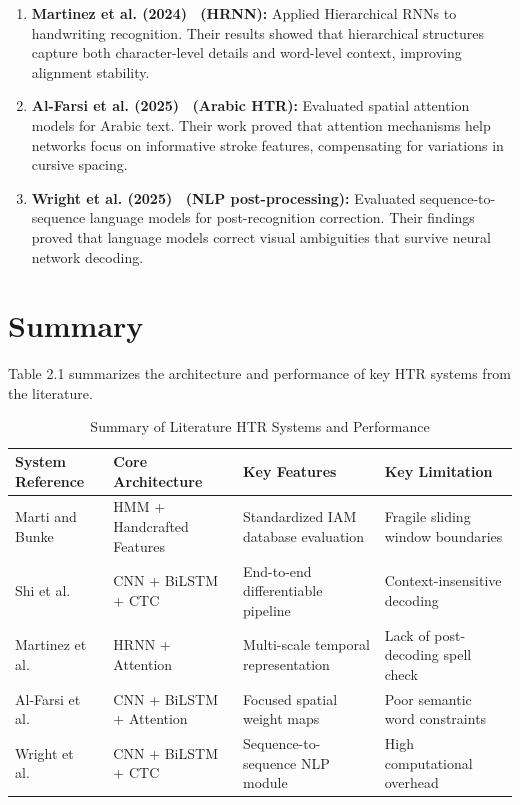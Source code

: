 \begin{enumerate}
    \item \textbf{Martinez et al. (2024)~\cite{study2024hrnn} (HRNN):} Applied Hierarchical RNNs to handwriting recognition. Their results showed that hierarchical structures capture both character-level details and word-level context, improving alignment stability.
    \item \textbf{Al-Farsi et al. (2025)~\cite{study2025arabic} (Arabic HTR):} Evaluated spatial attention models for Arabic text. Their work proved that attention mechanisms help networks focus on informative stroke features, compensating for variations in cursive spacing.
    \item \textbf{Wright et al. (2025)~\cite{study2025nlp} (NLP post-processing):} Evaluated sequence-to-sequence language models for post-recognition correction. Their findings proved that language models correct visual ambiguities that survive neural network decoding.
\end{enumerate}

\section{Summary}
Table 2.1 summarizes the architecture and performance of key HTR systems from the literature.

\begin{table}[h!]
\centering
\caption{Summary of Literature HTR Systems and Performance}
\label{tab:lit_summary}
\begin{tabular}{llll}
    \toprule
    \textbf{System Reference} & \textbf{Core Architecture} & \textbf{Key Features} & \textbf{Key Limitation} \\
    \midrule
    Marti and Bunke~\cite{marti2002iam} & HMM + Handcrafted Features & Standardized IAM database evaluation & Fragile sliding window boundaries \\
    Shi et al.~\cite{shi2017end} & CNN + BiLSTM + CTC & End-to-end differentiable pipeline & Context-insensitive decoding \\
    Martinez et al.~\cite{study2024hrnn} & HRNN + Attention & Multi-scale temporal representation & Lack of post-decoding spell check \\
    Al-Farsi et al.~\cite{study2025arabic} & CNN + BiLSTM + Attention & Focused spatial weight maps & Poor semantic word constraints \\
    Wright et al.~\cite{study2025nlp} & CNN + BiLSTM + CTC & Sequence-to-sequence NLP module & High computational overhead \\
    \bottomrule
\end{tabular}
\end{table}

